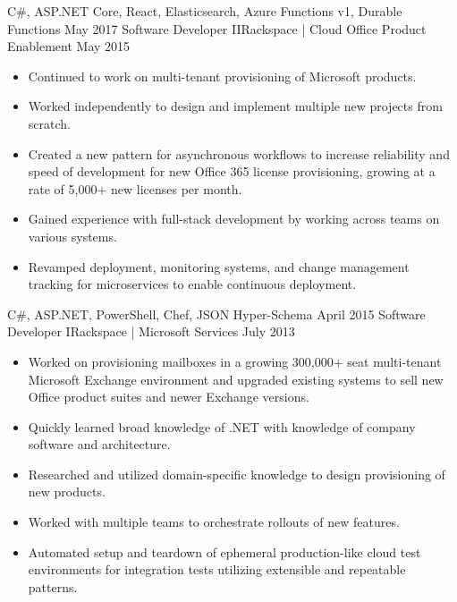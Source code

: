 \begin{experiences}
{\begin{itemize}
                      \end{itemize}
                    }
                    {C\#, ASP.NET Core, React, Elasticsearch, Azure Functions v1, Durable Functions}
  \emptySeparator
  \experience
    {May 2017}     {Software Developer II}{Rackspace | Cloud Office Product Enablement}
    {May 2015}     {
                      \begin{itemize}
                        \item Continued to work on multi-tenant provisioning of Microsoft products.
                        \item Worked independently to design and implement multiple new projects from scratch.
                        \item Created a new pattern for asynchronous workflows to increase reliability and speed of development for new Office 365 license provisioning, growing at a rate of 5,000+ new licenses per month.
                        \item Gained experience with full-stack development by working across teams on various systems.
                        \item Revamped deployment, monitoring systems, and change management tracking for microservices to enable continuous deployment.
                      \end{itemize}
                    }
                    {C\#, ASP.NET, PowerShell, Chef, JSON Hyper-Schema}
  \emptySeparator
  \experience
  {April 2015}       {Software Developer I}{Rackspace | Microsoft Services}
  {July 2013}        {
                      \begin{itemize}
                        \item Worked on provisioning mailboxes in a growing 300,000+ seat multi-tenant Microsoft Exchange environment and upgraded existing systems to sell new Office product suites and newer Exchange versions.
                        \item Quickly learned broad knowledge of .NET with knowledge of company software and architecture.
                        \item Researched and utilized domain-specific knowledge to design provisioning of new products.
                        \item Worked with multiple teams to orchestrate rollouts of new features.
                        \item Automated setup and teardown of ephemeral production-like cloud test environments for integration tests utilizing extensible and repeatable patterns.

\end{itemize}}
\end{experiences}
